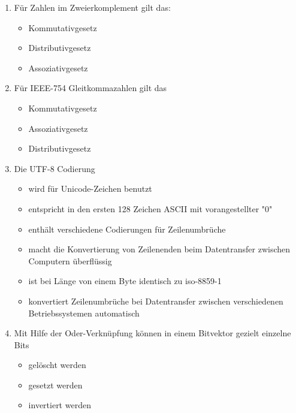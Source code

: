 \documentclass{exercisesheet}
\begin{document}
\begin{enumerate}
  \item Für Zahlen im Zweierkomplement gilt das:
        \begin{itemize}
          \item Kommutativgesetz \psolution{\checkmark}
          \item Distributivgesetz \psolution{\checkmark}
          \item Assoziativgesetz \psolution{\checkmark}
        \end{itemize}
  \item Für IEEE-754 Gleitkommazahlen gilt das
        \begin{itemize}
          \item Kommutativgesetz \psolution{\checkmark}
          \item Assoziativgesetz \psolution{\xmark}
          \item Distributivgesetz \psolution{\xmark}
        \end{itemize}
  \item Die UTF-8 Codierung
        \begin{itemize}
          \item wird für Unicode-Zeichen benutzt \psolution{\checkmark}
          \item entspricht in den ersten 128 Zeichen ASCII mit vorangestellter "0" \psolution{\checkmark}
          \item enthält verschiedene Codierungen für Zeilenumbrüche \psolution{\checkmark}
          \item macht die Konvertierung von Zeilenenden beim Datentransfer zwischen Computern überflüssig \psolution{\xmark}
          \item ist bei Länge von einem Byte identisch zu iso-8859-1 \psolution{\checkmark}
          \item konvertiert Zeilenumbrüche bei Datentransfer zwischen verschiedenen Betriebssystemen automatisch \psolution{\xmark}
        \end{itemize}
  \item Mit Hilfe der Oder-Verknüpfung können in einem Bitvektor gezielt einzelne Bits
        \begin{itemize}
          \item gelöscht werden \psolution{\xmark}
          \item gesetzt werden \psolution{\checkmark}
          \item invertiert werden \psolution{\xmark}

\end{itemize}
\end{enumerate}
\end{document}
